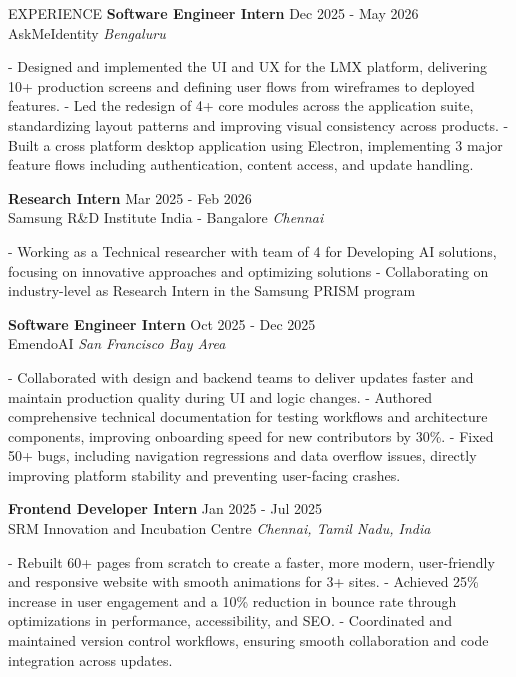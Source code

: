 \documentclass{resume} %
\begin{document}






\begin{rSection}{EXPERIENCE}
    \textbf{Software Engineer Intern} \hfill Dec 2025 - May 2026\\
AskMeIdentity \hfill \textit{Bengaluru}

- Designed and implemented the UI and UX for the LMX platform, delivering 10+ production screens and defining user flows from wireframes to deployed features.
- Led the redesign of 4+ core modules across the application suite, standardizing layout patterns and improving visual consistency across products.
- Built a cross platform desktop application using Electron, implementing 3 major feature flows including authentication, content access, and update handling.

\textbf{Research Intern} \hfill Mar 2025 - Feb 2026\\
Samsung R\&D Institute India - Bangalore \hfill \textit{Chennai}

- Working as a Technical researcher with team of 4 for Developing AI solutions, focusing on innovative approaches and optimizing solutions
- Collaborating on industry-level as Research Intern in the Samsung PRISM program

\textbf{Software Engineer Intern} \hfill Oct 2025 - Dec 2025\\
EmendoAI \hfill \textit{San Francisco Bay Area}

- Collaborated with design and backend teams to deliver updates faster and maintain production quality during UI and logic changes.
- Authored comprehensive technical documentation for testing workflows and architecture components, improving onboarding speed for new contributors by 30\%.
- Fixed 50+ bugs, including navigation regressions and data overflow issues, directly improving platform stability and preventing user-facing crashes.

\textbf{Frontend Developer Intern} \hfill Jan 2025 - Jul 2025\\
SRM Innovation and Incubation Centre \hfill \textit{Chennai, Tamil Nadu, India}

- Rebuilt 60+ pages from scratch to create a faster, more modern, user-friendly and responsive website with smooth animations for 3+ sites.
- Achieved 25\% increase in user engagement and a 10\% reduction in bounce rate through optimizations in performance, accessibility, and SEO.
- Coordinated and maintained version control workflows, ensuring smooth collaboration and code integration across updates.

\end{rSection}
\end{document}
